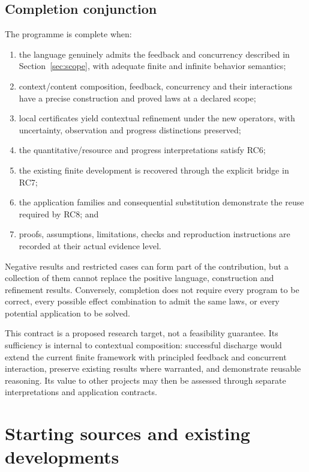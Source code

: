 \documentclass[11pt,a4paper]{article}
\begin{document}
\subsection{Completion conjunction}
The programme is complete when:
\begin{enumerate}[label=\arabic*.]
\item the language genuinely admits the feedback and concurrency described in Section~\ref{sec:scope}, with adequate finite and infinite behavior semantics;
\item context/content composition, feedback, concurrency and their interactions have a precise construction and proved laws at a declared scope;
\item local certificates yield contextual refinement under the new operators, with uncertainty, observation and progress distinctions preserved;
\item the quantitative/resource and progress interpretations satisfy RC6;
\item the existing finite development is recovered through the explicit bridge in RC7;
\item the application families and consequential substitution demonstrate the reuse required by RC8; and
\item proofs, assumptions, limitations, checks and reproduction instructions are recorded at their actual evidence level.
\end{enumerate}
Negative results and restricted cases can form part of the contribution, but a collection of them cannot replace the positive language, construction and refinement results. Conversely, completion does not require every program to be correct, every possible effect combination to admit the same laws, or every potential application to be solved.

This contract is a proposed research target, not a feasibility guarantee. Its sufficiency is internal to contextual composition: successful discharge would extend the current finite framework with principled feedback and concurrent interaction, preserve existing results where warranted, and demonstrate reusable reasoning. Its value to other projects may then be assessed through separate interpretations and application contracts.

\section{Starting sources and existing developments}\label{sec:sources}
\end{document}

